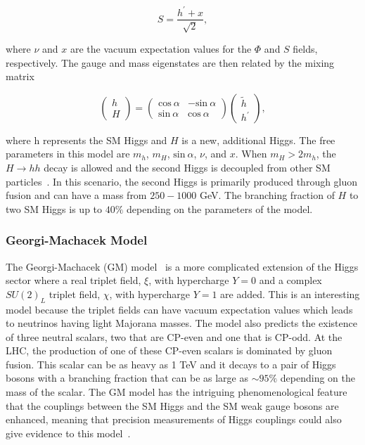 \begin{equation}
S= \frac{h^{\prime}+x}{\sqrt{2}},
\end{equation}

\noindent
where $\nu$ and $x$ are the vacuum expectation values for the $\Phi$ and $S$ fields, respectively. The gauge and mass eigenstates are then related by the mixing matrix

\begin{equation}
\begin{pmatrix}
h\\
H
\end{pmatrix}
= 
\begin{pmatrix}
\mathrm{cos}\: \alpha & -\mathrm{sin}\: \alpha \\
\mathrm{sin}\: \alpha & \mathrm{cos}\:\alpha
\end{pmatrix}
\begin{pmatrix}
\widetilde{h}\\
h^{\prime}
\end{pmatrix},
\end{equation} 

\noindent
where h represents the SM Higgs and $H$ is a new, additional Higgs. The free parameters in this model are $m_{h}$, $m_{H}$, $\mathrm{sin}\:\alpha$, $\nu$, and $x$. When $m_{H} > 2m_{h}$, the $H\rightarrow hh$ decay is allowed and the second Higgs is decoupled from other SM particles~\cite{HiggsSingletPheno}. In this scenario, the second Higgs is primarily produced through gluon fusion and can have a mass from $250-1000$ GeV. The branching fraction of $H$ to two SM Higgs is up to $40\%$ depending on the parameters of the model.

\subsubsection{Georgi-Machacek Model}

The Georgi-Machacek (GM) model~\cite{GMmodel} is a more complicated extension of the Higgs sector where a real triplet field, $\xi$, with hypercharge $Y=0$ and a complex $SU(2)_{L}$ triplet field, $\chi$, with hypercharge $Y=1$ are added. This is an interesting model because the triplet fields can have vacuum expectation values which leads to neutrinos having light Majorana masses. The model also predicts the existence of three neutral scalars, two that are CP-even and one that is CP-odd. At the LHC, the production of one of these CP-even scalars is dominated by gluon fusion. This scalar can be as heavy as 1 TeV and it decays to a pair of Higgs bosons with a branching fraction that can be as large as ${\sim}95\%$ depending on the mass of the scalar. The GM model has the intriguing phenomenological feature that the couplings between the SM Higgs and the SM weak gauge bosons are enhanced, meaning that precision measurements of Higgs couplings could also give evidence to this model~\cite{GMmodelPheno}.

















